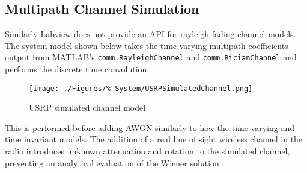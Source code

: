 \subsection{Multipath Channel Simulation}
Similarly Labview does not provide an API for rayleigh %
fading channel models. The system model shown below %
takes the time-varying multipath coefficients output %
from MATLAB's \texttt{comm.RayleighChannel} and %
\texttt{comm.RicianChannel} and performs the discrete time %
convolution.

\begin{figure}[ht]
	\texttt{[image: ./Figures/\%
	System/USRPSimulatedChannel.png]}
	\caption{USRP simulated channel model}
	\label{fig:USRPSimChan}
\end{figure}

This is performed before adding AWGN similarly to how the %
time varying and time invariant models. The addition of %
a real line of sight wireless channel in the radio introduces %
unknown attenuation and rotation to the simulated channel, %
preventing an analytical evaluation of the Wiener solution. %
